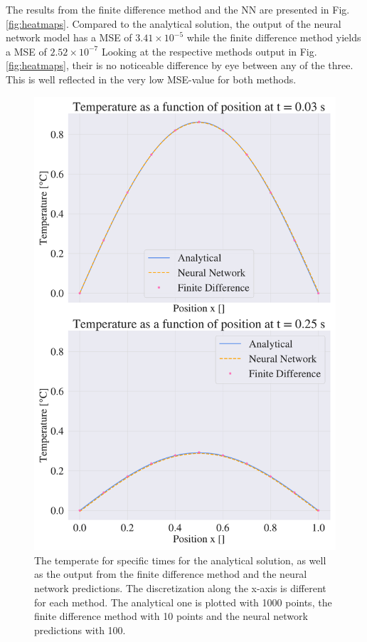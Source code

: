 The results from the finite difference method and the NN are presented in Fig. \ref{fig:heatmaps}.
Compared to the analytical solution, the output of the neural network model has a MSE of $ 3.41 \times 10^{-5}$ while the finite difference method yields a MSE of $2.52 \times 10^{-7}$
Looking at the respective methods output in Fig. \ref{fig:heatmaps}, their is no noticeable difference by eye between any of the three.  
This is well reflected in the very low MSE-value for both methods. 

\begin{figure}[h!]
    \centering
    \includegraphics[width=1.0\linewidth]{project_3/plots/time_slices_comparison.pdf}
    \caption{The temperate for specific times for the analytical solution, as well as the output from the finite difference method and the neural network predictions. The discretization along the x-axis is different for each method. The analytical one is plotted with 1000 points, the finite difference method with 10 points and the neural network predictions with 100. 
    }
    \label{fig:timeslices}
\end{figure}




